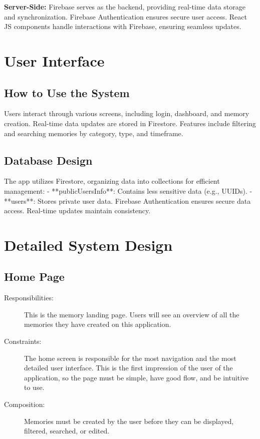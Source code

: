 \documentclass{article}
\begin{document}
\textbf{Server-Side:} 
Firebase serves as the backend, providing real-time data storage and synchronization. Firebase Authentication ensures secure user access. React JS components handle interactions with Firebase, ensuring seamless updates.

\section{User Interface}
\subsection{How to Use the System}
Users interact through various screens, including login, dashboard, and memory creation. Real-time data updates are stored in Firestore. Features include filtering and searching memories by category, type, and timeframe.

\subsection{Database Design}
The app utilizes Firestore, organizing data into collections for efficient management:
- **publicUsersInfo**: Contains less sensitive data (e.g., UUIDs).
- **users**: Stores private user data.
Firebase Authentication ensures secure data access. Real-time updates maintain consistency.

\section{Detailed System Design}
\subsection{Home Page}
\begin{description}
\item[Responsibilities:] This is the memory landing page. Users will see an overview of all the memories they have created
on this application.
\item[Constraints:] The home screen is responsible for the most navigation and the most detailed user
interface. This is the first impression of the user of the application, so the page must be simple, have
good flow, and be intuitive to use.
\item[Composition:] Memories must be created by the user before they can be displayed, filtered, searched, or edited.
\end{description}
\end{document}
